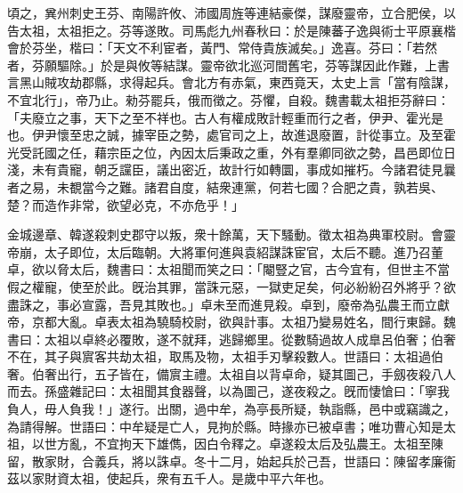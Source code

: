 \begin{pinyinscope}
頃之，兾州刺史王芬、南陽許攸、沛國周旌等連結豪傑，謀廢靈帝，立合肥侯，以告太祖，太祖拒之。芬等遂敗。司馬彪九州春秋曰：於是陳蕃子逸與術士平原襄楷會於芬坐，楷曰：「天文不利宦者，黃門、常侍貴族滅矣。」逸喜。芬曰：「若然者，芬願驅除。」於是與攸等結謀。靈帝欲北巡河間舊宅，芬等謀因此作難，上書言黑山賊攻劫郡縣，求得起兵。會北方有赤氣，東西竟天，太史上言「當有陰謀，不宜北行」，帝乃止。勑芬罷兵，俄而徵之。芬懼，自殺。魏書載太祖拒芬辭曰：「夫廢立之事，天下之至不祥也。古人有權成敗計輕重而行之者，伊尹、霍光是也。伊尹懷至忠之誠，據宰臣之勢，處官司之上，故進退廢置，計從事立。及至霍光受託國之任，藉宗臣之位，內因太后秉政之重，外有羣卿同欲之勢，昌邑即位日淺，未有貴寵，朝乏讜臣，議出密近，故計行如轉圜，事成如摧朽。今諸君徒見曩者之易，未覩當今之難。諸君自度，結衆連黨，何若七國？合肥之貴，孰若吳、楚？而造作非常，欲望必克，不亦危乎！」

金城邊章、韓遂殺刺史郡守以叛，衆十餘萬，天下騷動。徵太祖為典軍校尉。會靈帝崩，太子即位，太后臨朝。大將軍何進與袁紹謀誅宦官，太后不聽。進乃召董卓，欲以脅太后，魏書曰：太祖聞而笑之曰：「閹豎之官，古今宜有，但世主不當假之權寵，使至於此。旣治其罪，當誅元惡，一獄吏足矣，何必紛紛召外將乎？欲盡誅之，事必宣露，吾見其敗也。」卓未至而進見殺。卓到，廢帝為弘農王而立獻帝，京都大亂。卓表太祖為驍騎校尉，欲與計事。太祖乃變易姓名，間行東歸。魏書曰：太祖以卓終必覆敗，遂不就拜，逃歸鄉里。從數騎過故人成臯呂伯奢；伯奢不在，其子與賔客共劫太祖，取馬及物，太祖手刃擊殺數人。世語曰：太祖過伯奢。伯奢出行，五子皆在，備賔主禮。太祖自以背卓命，疑其圖己，手劔夜殺八人而去。孫盛雜記曰：太祖聞其食器聲，以為圖己，遂夜殺之。旣而悽愴曰：「寧我負人，毋人負我！」遂行。出關，過中牟，為亭長所疑，執詣縣，邑中或竊識之，為請得解。世語曰：中牟疑是亡人，見拘於縣。時掾亦已被卓書；唯功曹心知是太祖，以世方亂，不宜拘天下雄儁，因白令釋之。卓遂殺太后及弘農王。太祖至陳留，散家財，合義兵，將以誅卓。冬十二月，始起兵於己吾，世語曰：陳留孝廉衞茲以家財資太祖，使起兵，衆有五千人。是歲中平六年也。


\end{pinyinscope}
